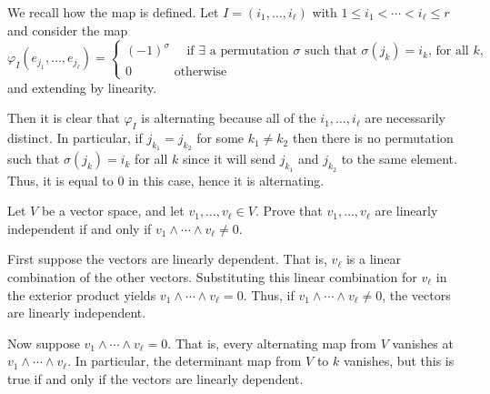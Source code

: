 \documentclass[../../master.tex]{subfiles}
\begin{document}
\begin{solution}
    We recall how the map is defined.
    Let $I = (i_1, \ldots, i_\ell)$ with $1 \leq i_1 < \cdots < i_\ell \leq r$ and consider the map
    \[
    \varphi_I(e_{j_1}, \ldots, e_{j_\ell}) =
    \begin{cases}
        (-1)^{\sigma} \quad \text{ if $\exists$ a permutation $\sigma$ such that $\sigma(j_k) = i_k$, for all $k$,} \\
            0 \qquad \quad \text{ otherwise}
    \end{cases}
    \]
    and extending by linearity.

    Then it is clear that $\varphi_I$ is alternating because all of the $i_1, \ldots, i_\ell$ are necessarily distinct.
    In particular, if $j_{k_1} = j_{k_2}$ for some $k_1 \neq k_2$ then there is no permutation such that $\sigma(j_k) = i_k$ for all $k$ since it will send $j_{k_1}$ and $j_{k_2}$ to the same element.
    Thus, it is equal to 0 in this case, hence it is alternating.
\end{solution}

\begin{problem}
    Let $V$ be a vector space, and let $v_1, \ldots, v_\ell \in V$.
    Prove that $v_1, \ldots, v_\ell$ are linearly independent if and only if $v_1 \wedge \cdots \wedge v_\ell \neq 0$.
\end{problem}

\begin{solution}
    First suppose the vectors are linearly dependent.
    That is, $v_\ell$ is a linear combination of the other vectors.
    Substituting this linear combination for $v_\ell$ in the exterior product yields $v_1 \wedge \cdots \wedge v_\ell = 0$.
    Thus, if $v_1 \wedge \cdots \wedge v_\ell \neq 0$, the vectors are linearly independent.

    Now suppose $v_1 \wedge \cdots \wedge v_\ell = 0$.
    That is, every alternating map from $V$ vanishes at $v_1 \wedge \cdots \wedge v_\ell$.
    In particular, the determinant map from $V$ to $k$ vanishes, but this is true if and only if the vectors are linearly dependent.
\end{solution}
\end{document}

